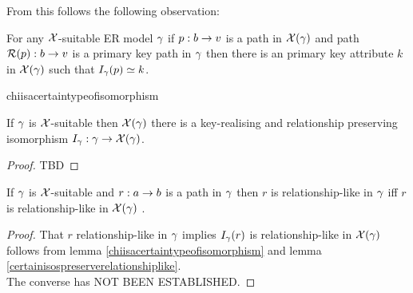 From this follows the following observation:

\begin{observation}
\label{pathinjectionobservation}
For any $\mathcal{X}$-suitable ER model $\gamma$ if $p:b \rightarrow v$ is a path in $\mathcal{X}(\gamma)$ and  path $\mathcal{R}(p):b \rightarrow v$ is a primary key path in $\gamma$  then there is an primary key attribute $k$ in $\mathcal{X}(\gamma)$ such that $I_\gamma(p) \simeq k$. 
\end{observation}

chiisacertaintypeofisomorphism
\begin{lemma}
\label{chiisacertaintypeofisomorphism}
If $\gamma$ is $\mathcal{X}$-suitable  then $\mathcal{X}(\gamma)$ there is a key-realising and
relationship preserving  isomorphism $I_\gamma: \gamma \rightarrow \mathcal{X}(\gamma)$. 
\end{lemma}
\begin{proof}
TBD 
\end{proof}

\begin{lemma}
\label{relationshiplikecarrythroughlemma}
If $\gamma$ is $\mathcal{X}$-suitable  and $r:a \rightarrow b$ is a path in $\gamma$ then $r$ is relationship-like in $\gamma$ iff $r$ is relationship-like in $\mathcal{X}(\gamma)$ .
\end{lemma}
\begin{proof}
That $r$ relationship-like in $\gamma$ implies $I_\gamma(r)$ is relationship-like in $\mathcal{X}(\gamma)$ follows from lemma
\ref{chiisacertaintypeofisomorphism} and lemma \ref{certainisospreserverelationshiplike}. \\

The converse has NOT BEEN ESTABLISHED.
\end{proof}

